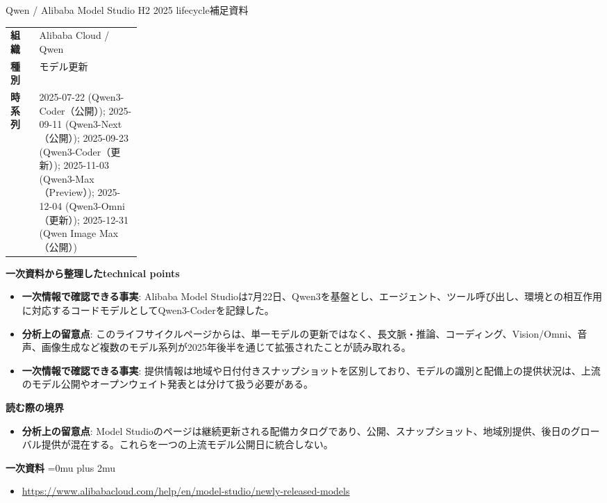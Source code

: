 \begin{technicalnote}{Qwen / Alibaba Model Studio H2 2025 lifecycle}{補足資料}
\begingroup
\begin{tabularx}{\linewidth}{@{}>{\bfseries}p{0.22\linewidth}X@{}}
組織 & Alibaba Cloud / Qwen \\
種別 & モデル更新 \\
時系列 & 2025-07-22 (Qwen3-Coder（公開）); 2025-09-11 (Qwen3-Next（公開）); 2025-09-23 (Qwen3-Coder（更新）); 2025-11-03 (Qwen3-Max（Preview）); 2025-12-04 (Qwen3-Omni（更新）); 2025-12-31 (Qwen Image Max（公開）) \\
\end{tabularx}
\smallskip
{\bfseries 一次資料から整理したtechnical points}
\begin{itemize}[leftmargin=1.5em,itemsep=0.35em]
\item \textbf{一次情報で確認できる事実}: Alibaba Model Studioは7月22日、Qwen3を基盤とし、エージェント、ツール呼び出し、環境との相互作用に対応するコードモデルとしてQwen3-Coderを記録した。
\item \textbf{分析上の留意点}: このライフサイクルページからは、単一モデルの更新ではなく、長文脈・推論、コーディング、Vision/Omni、音声、画像生成など複数のモデル系列が2025年後半を通じて拡張されたことが読み取れる。
\item \textbf{一次情報で確認できる事実}: 提供情報は地域や日付付きスナップショットを区別しており、モデルの識別と配備上の提供状況は、上流のモデル公開やオープンウェイト発表とは分けて扱う必要がある。
\end{itemize}
\begin{minipage}{\linewidth}
{\bfseries 読む際の境界}
\begin{itemize}[leftmargin=1.5em,itemsep=0.35em]
\item \textbf{分析上の留意点}: Model Studioのページは継続更新される配備カタログであり、公開、スナップショット、地域別提供、後日のグローバル提供が混在する。これらを一つの上流モデル公開日に統合しない。
\end{itemize}
\begin{samepage}
{\bfseries 一次資料}
\begingroup\sloppy
\Urlmuskip=0mu plus 2mu\relax
\begin{itemize}[leftmargin=1.5em,itemsep=0.25em]
\item {\scriptsize\url{https://www.alibabacloud.com/help/en/model-studio/newly-released-models}}
\end{itemize}
\endgroup
\end{samepage}
\end{minipage}
\endgroup
\end{technicalnote}
\medskip

